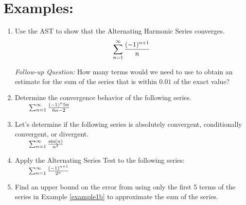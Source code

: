 \section*{Examples:}
\begin{enumerate}[{Example} 1:]



\item Use the AST to show that the Alternating Harmonic Series converges.
\[\sum_{n=1}^\infty \frac{(-1)^{n+1}}{n}\]

\vfill

\hspace*{-.75in} \textit{Follow-up Question:} How many terms would we need to use to obtain an estimate for the sum of the series that is within \(0.01\) of the exact value?

\vfill

\item Determine the convergence behavior of the following series.\\
\( \qquad
\sum_{n=1}^\infty \frac{(-1)^n 5n}{6n-2}
\)


\vfill

\pagebreak

\item Let's determine if the following series is absolutely convergent, conditionally convergent, or divergent.\\%
\(\qquad\sum_{n=1}^\infty \frac{\sin(n)}{n^2}\) %


\vfill

\item Apply the Alternating Series Test to the following series:\\
\( \qquad  \sum_{n=1}^\infty	\frac{(-1)^{n+1}}{2^{n}}\)\label{example1b}
\vfill

\item Find an upper bound on the error from using only the first 5 terms of the series in Example \ref{example1b} to approximate the sum of the series. 

\vfill




\end{enumerate}

